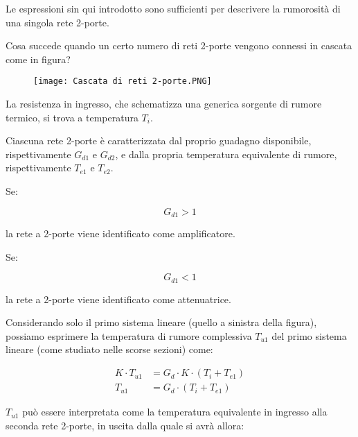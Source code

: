 Le espressioni sin qui introdotto sono sufficienti per descrivere la rumorosità di una singola rete 2-porte. \newline 

Cosa succede quando un certo numero di reti 2-porte vengono connessi in cascata come in figura? 

\begin{figure}[h]
    \centering
    \texttt{[image: Cascata di reti 2-porte.PNG]}
\end{figure}

La resistenza in ingresso, che schematizza una generica sorgente di rumore termico, si trova a temperatura $T_i$. \newline 

Ciascuna rete 2-porte è caratterizzata dal proprio guadagno disponibile, rispettivamente $G_{d1}$ e $G_{d2}$, e dalla propria temperatura equivalente di rumore, 
rispettivamente $T_{e1}$ e $T_{e2}$. \newline 

Se: 

{
    \Large 
    \begin{equation}
        G_{d1} > 1
    \end{equation}
}

la rete a 2-porte viene identificato come amplificatore. \newline 

Se: 

{
    \Large 
    \begin{equation}
        G_{d1} < 1
    \end{equation}
}

la rete a 2-porte viene identificato come attenuatrice. \newline 

Considerando solo il primo sistema lineare (quello a sinistra della figura), 
possiamo esprimere la temperatura di rumore complessiva $T_{u1}$ del primo sistema lineare 
(come studiato nelle scorse sezioni) come: 

{
    \Large 
    \begin{equation}
        \begin{split}
            K \cdot T_{u1} &= G_d \cdot K \cdot (T_i + T_{e1})
            \\
            T_{u1} &= G_d \cdot (T_i + T_{e1})
        \end{split}
    \end{equation}
}

$T_{u1}$ può essere interpretata come la temperatura equivalente in ingresso alla seconda rete 2-porte, 
in uscita dalla quale si avrà allora: 

